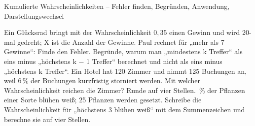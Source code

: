 \begin{aufgabe}{Kumulierte Wahrscheinlichkeiten – Fehler finden, Begründen, Anwendung, Darstellungswechsel}
\begin{teile}
\teil Ein Glücksrad bringt mit der Wahrscheinlichkeit $0{,}35$ einen Gewinn und wird 20-mal gedreht; X ist die Anzahl der Gewinne. Paul rechnet für „mehr als 7 Gewinne“:  Finde den Fehler.
\teil Begründe, warum man „mindestens k Treffer“ als eins minus „höchstens k − 1 Treffer“ berechnet und nicht als eins minus „höchstens k Treffer“.
\teil Ein Hotel hat 120 Zimmer und nimmt 125 Buchungen an, weil 6\,\% der Buchungen kurzfristig storniert werden. Mit welcher Wahrscheinlichkeit reichen die Zimmer? Runde auf vier Stellen.
\,\% der Pflanzen einer Sorte blühen weiß; 25 Pflanzen werden gesetzt. Schreibe die Wahrscheinlichkeit für „höchstens 3 blühen weiß“ mit dem Summenzeichen und berechne sie auf vier Stellen.
\end{teile}
\end{aufgabe}
